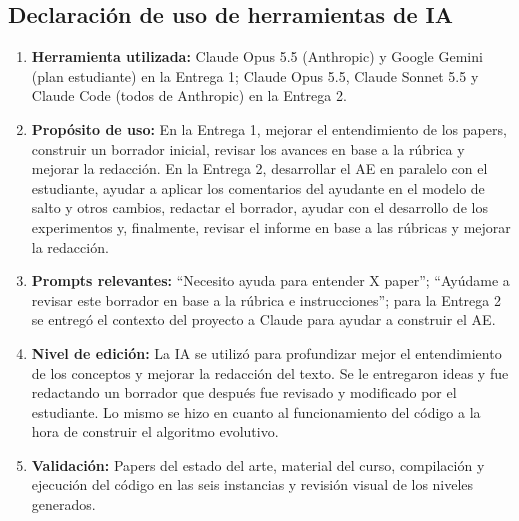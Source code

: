 \documentclass[letter, 10pt]{article}
\begin{document}
\subsection*{Declaraci\'on de uso de herramientas de IA}
\begingroup\small
\begin{enumerate}\setlength\itemsep{0pt}\setlength\parskip{0pt}
\item \textbf{Herramienta utilizada:} Claude Opus 5.5 (Anthropic) y Google Gemini (plan estudiante) en la Entrega 1; Claude Opus 5.5, Claude Sonnet 5.5 y Claude Code (todos de Anthropic) en la Entrega 2.
\item \textbf{Prop\'osito de uso:} En la Entrega 1, mejorar el entendimiento de los papers, construir un borrador inicial, revisar los avances en base a la r\'ubrica y mejorar la redacci\'on. En la Entrega 2, desarrollar el AE en paralelo con el estudiante, ayudar a aplicar los comentarios del ayudante en el modelo de salto y otros cambios, redactar el borrador, ayudar con el desarrollo de los experimentos y, finalmente, revisar el informe en base a las r\'ubricas y mejorar la redacci\'on.
\item \textbf{Prompts relevantes:} ``Necesito ayuda para entender X paper''; ``Ay\'udame a revisar este borrador en base a la r\'ubrica e instrucciones''; para la Entrega 2 se entreg\'o el contexto del proyecto a Claude para ayudar a construir el AE.
\item \textbf{Nivel de edici\'on:} La IA se utilizó para profundizar mejor el entendimiento de los conceptos y mejorar la redacci\'on del texto. Se le entregaron ideas y fue redactando un borrador que después fue revisado y modificado por el estudiante. Lo mismo se hizo en cuanto al funcionamiento del código a la hora de construir el algoritmo evolutivo. 
\item \textbf{Validaci\'on:} Papers del estado del arte, material del curso, compilaci\'on y ejecuci\'on del c\'odigo en las seis instancias y revisi\'on visual de los niveles generados.
\end{enumerate}
\endgroup
\end{document}
